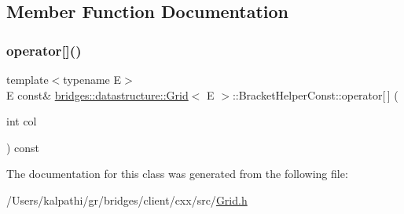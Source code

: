 \subsection{Member Function Documentation}
\mbox{\label{classbridges_1_1datastructure_1_1_grid_1_1_bracket_helper_const_a3a0571d419200f98e525441e16bb707c}} 
\subsubsection{\texorpdfstring{operator[]()}{operator[]()}}
{\footnotesize\ttfamily template$<$typename E$>$ \\
E const\& \mbox{\hyperlink{classbridges_1_1datastructure_1_1_grid}{bridges\+::datastructure\+::\+Grid}}$<$ E $>$\+::Bracket\+Helper\+Const\+::operator\mbox{[}$\,$\mbox{]} (\begin{DoxyParamCaption}\item[{int}]{col }\end{DoxyParamCaption}) const\hspace{0.3cm}{\ttfamily [inline]}}



The documentation for this class was generated from the following file\+:\begin{DoxyCompactItemize}
\item 
/\+Users/kalpathi/gr/bridges/client/cxx/src/\mbox{\hyperlink{_grid_8h}{Grid.\+h}}\end{DoxyCompactItemize}
